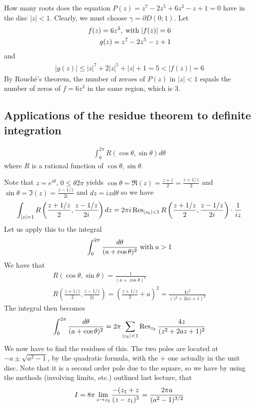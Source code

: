 \begin{ex}
    How many roots does the equation $P(z)=z^7-2z^5+6z^3-z+1=0$ have in the disc $|z|<1$. Clearly, we must choose $\gamma=\partial D(0;1)$. Let
    \begin{align*}
        f(z)=6z^3,\;\textnormal{with}\;|f(z)|=6\\
        g(z)=z^7-2z^5-z+1
    \end{align*}
    and
    \begin{align*}
        |g(z)|\leq |z|^7+2|z|^5+|z|+1=5<|f(z)|=6
    \end{align*}
    By Rouch\'{e}'s theorem,
    the number of zeroes of $P(z)$ in $|z|<1$ equals the number of zeros of $f=6z^3$ in the same region, which is 3.
\end{ex}

\subsection{Applications of the residue theorem to definite integration}
\begin{ex}
    \begin{align*}
        \int_0^{2\pi}R(\cos\theta,\sin\theta) d\theta
    \end{align*}
    where $R$ is a rational function of $\cos\theta, \sin\theta$.

    Note that $z=e^{i\theta}$, $0\leq\theta2\pi$ yields $\cos\theta=\Re(z)=\frac{z+\bar{z}}{2}=\frac{z+1/z}{2}$ and $\sin\theta=\Im(z)=\frac{z-1/z}{2i}$
    and $dz=izd\theta$ so we have
    \begin{align*}
        \int_{|z|=1}R\left(\frac{z+1/z}{2},\frac{z-1/z}{2i}\right) dz=2\pi i \operatorname{Res}_{|z_k|<1} R\left( \frac{z+1/z}{2}, \frac{z-1/z}{2i} \right)\cdot \frac{1}{iz}
    \end{align*}
    Let us apply this to the integral
    \begin{align*}
        \int_0^{2\pi} \frac{d\theta}{(a+\cos\theta)^2} \;\textnormal{with}\; a>1\\
    \end{align*}
    We have that
    \begin{align*}
        R(\cos\theta,\sin\theta)=\frac{1}{(a+\cos\theta)^2}\\
        R\left( \frac{z+1/z}{2},\frac{z-1/z}{2i} \right)=\left( \frac{z+1/z}{2}+a \right)^2=\frac{4z^2}{(z^2+2az+1)^2}
    \end{align*}
    The integral then becomes
    \begin{align*}
        \int_0^{2\pi} \frac{d\theta}{(a+\cos\theta)^2}=2\pi \sum_{|z_k|<1}\operatorname{Res}_{z_k}\frac{4z}{(z^2+2az+1)^2}
    \end{align*}
    We now have to find the residues of this. The two poles are located at $-a\pm\sqrt{a^2-1}$, by the quadratic formula, with the $+$ one actually in the unit disc. Note
    that it is a second order pole due to the square, so we have by using the methods (involving limits, etc.) outlined last lecture, that 
    \begin{align*}
        I=8\pi \lim_{z\rightarrow z_2}\frac{-(z_1+z}{(z-z_1)^3}=\frac{2\pi a}{(a^2-1)^{3/2}}
    \end{align*}
\end{ex}

